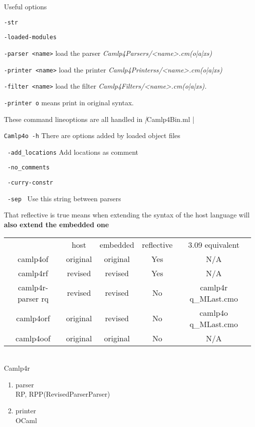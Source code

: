 Useful options 

\verb|-str|

\verb|-loaded-modules|

\verb|-parser <name>| load the parser \textit{Camlp4Parsers/<name>.cm(o|a|xs)}


\verb|-printer <name>| load the printer
\textit{Camlp4Printerss/<name>.cm(o|a|xs)}

\verb|-filter <name>| load the filter 
\textit{Camlp4Filters/<name>.cm(o|a|xs).}


\verb|-printer o| means print in original syntax. 


These command lineoptions are all handled in \emph|Camlp4Bin.ml |

\verb|Camlp4o -h| 
There are options added by loaded object files


\verb| -add_locations| Add locations as comment


\verb| -no_comments|


\verb| -curry-constr |


\verb| -sep | Use this string between parsers 


That reflective is true means when extending the syntax of the host
language will \textbf{ also extend the embedded one}


  \begin{tabular}{|c|c|c|c|c|}
    \hline
                      & host     & embedded & reflective & 3.09 equivalent     \\
    camlp4of          & original & original & Yes        & N/A                 \\
    camlp4rf          & revised  & revised  & Yes        & N/A                 \\
    camlp4r-parser rq & revised  & revised  & No         & camlp4r q\_MLast.cmo \\
    camlp4orf         & original & revised  & No         & camlp4o q\_MLast.cmo \\
    camlp4oof         & original & original & No         & N/A                 \\
    \hline
  \end{tabular} \\
  
Camlp4r
    \begin{enumerate}
    \item parser \\
      RP, RPP(RevisedParserParser)
    \item printer \\
      OCaml
    \end{enumerate}


